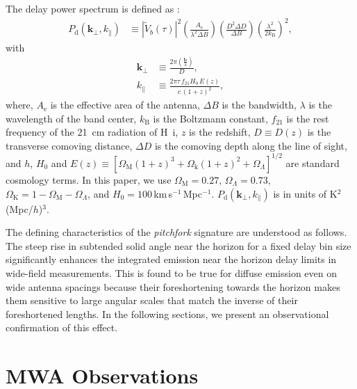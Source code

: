 \documentclass[preprint2,apjl,numberedappendix,twocolappendix,appendixfloats]{emulateapj}
\begin{document}
The delay power spectrum is defined as \citep[][Paper~I]{par12a}:
\begin{align}\label{eqn:delay-power-spectrum}
  P_\textrm{d}(\boldsymbol{k}_\perp,k_\parallel) &\equiv |\widetilde{V}_b(\tau)|^2\left(\frac{A_\textrm{e}}{\lambda^2\Delta B}\right)\left(\frac{D^2\Delta D}{\Delta B}\right)\left(\frac{\lambda^2}{2k_\textrm{B}}\right)^2,
\end{align}
with
\begin{align}
  \boldsymbol{k}_\perp &\equiv \frac{2\pi(\frac{\boldsymbol{b}}{\lambda})}{D}, \\
  k_\parallel &\equiv \frac{2\pi\tau\,f_{21}H_0\,E(z)}{c\,(1+z)^2}, 
\end{align}
where, $A_\textrm{e}$ is the effective area of the antenna, $\Delta B$ is the bandwidth, $\lambda$ is the wavelength of the band center, $k_\textrm{B}$ is the Boltzmann constant, $f_{21}$ is the rest frequency of the 21~cm radiation of H~{\sc i}, $z$ is the redshift, $D\equiv D(z)$ is the transverse comoving distance, $\Delta D$ is the comoving depth along the line of sight, and $h$, $H_0$ and $E(z)\equiv [\Omega_\textrm{M}(1+z)^3+\Omega_\textrm{k}(1+z)^2+\Omega_\Lambda]^{1/2}$ are standard cosmology terms. In this paper, we use $\Omega_\textrm{M}=0.27$, $\Omega_\Lambda=0.73$, $\Omega_\textrm{K}=1-\Omega_\textrm{M}-\Omega_\Lambda$, and $H_0=100\,$km$\,$s$^{-1}\,$Mpc$^{-1}$. $P_\textrm{d}(\boldsymbol{k}_\perp,k_\parallel)$ is in units of K$^2$(Mpc/$h$)$^3$.

The defining characteristics of the {\it pitchfork} signature are understood as follows. The steep rise in subtended solid angle near the horizon for a fixed delay bin size significantly enhances the integrated emission near the horizon delay limits in wide-field measurements. This is found to be true for diffuse emission even on wide antenna spacings because their foreshortening towards the horizon makes them sensitive to large angular scales that match the inverse of their foreshortened lengths. In the following sections, we present an observational confirmation of this effect.

\section{MWA Observations}\label{sec:MWA}
\end{document}

